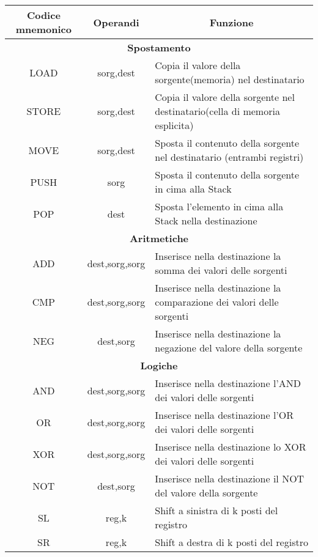 \documentclass{article}
\begin{document}
\begin{table}[H]
\begin{adjustwidth}{-2.7cm}{}
    \centering
    \begin{tabular}{|c|c|l|}
    \hline
        Codice mnemonico & Operandi & \multicolumn{1}{c|}{Funzione} \\
    \hline
        \multicolumn{3}{|c|}{\textbf{Spostamento}}\\
    \hline
        LOAD & sorg,dest & Copia il valore della sorgente(memoria) nel destinatario \\
    \hline
        STORE & sorg,dest & Copia il valore della sorgente nel destinatario(cella di memoria esplicita) \\
    \hline
        MOVE & sorg,dest & Sposta il contenuto della sorgente nel destinatario (entrambi registri)\\
    \hline
        PUSH & sorg & Sposta il contenuto della sorgente in cima alla Stack \\
    \hline
        POP & dest & Sposta l'elemento in cima alla Stack nella destinazione \\
    \hline
        \multicolumn{3}{|c|}{\textbf{Aritmetiche}}\\
    \hline
        ADD & dest,sorg,sorg & Inserisce nella destinazione la somma dei valori delle sorgenti \\
    \hline
        CMP & dest,sorg,sorg & Inserisce nella destinazione la comparazione dei valori delle sorgenti \\
    \hline
        NEG & dest,sorg & Inserisce nella destinazione la negazione del valore della sorgente \\
    \hline
        \multicolumn{3}{|c|}{\textbf{Logiche}}\\
    \hline
        AND & dest,sorg,sorg & Inserisce nella destinazione l'AND dei valori delle sorgenti \\
    \hline
        OR & dest,sorg,sorg & Inserisce nella destinazione l'OR dei valori delle sorgenti \\
    \hline
        XOR & dest,sorg,sorg & Inserisce nella destinazione lo XOR dei valori delle sorgenti \\
    \hline
        NOT & dest,sorg & Inserisce nella destinazione il NOT del valore della sorgente \\
    \hline
        SL & reg,k & Shift a sinistra di k posti del registro \\
    \hline
        SR & reg,k & Shift a destra di k posti del registro \\

\end{tabular}
\end{adjustwidth}
\end{table}
\end{document}
